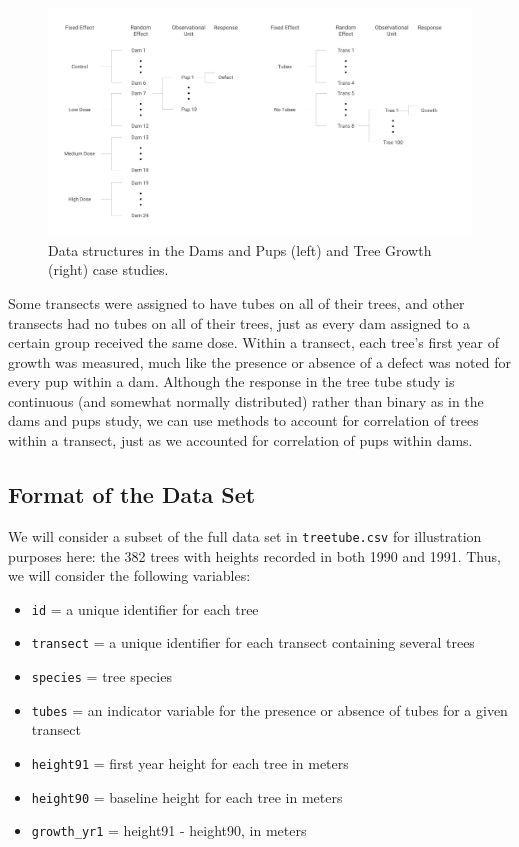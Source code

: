 \documentclass[
]{krantz}
\providecommand{\tightlist}{%
  \setlength{\itemsep}{0pt}\setlength{\parskip}{0pt}}
\begin{document}
\begin{figure}
\includegraphics[width=0.8\linewidth,height=1.25\textheight]{data/DamsTreesStructure} \caption{Data structures in the Dams and Pups (left) and Tree Growth (right) case studies.}\label{fig:DamsTreesStructure}
\end{figure}

Some transects were assigned to have tubes on all of their trees, and other transects had no tubes on all of their trees, just as every dam assigned to a certain group received the same dose. Within a transect, each tree's first year of growth was measured, much like the presence or absence of a defect was noted for every pup within a dam. Although the response in the tree tube study is continuous (and somewhat normally distributed) rather than binary as in the dams and pups study, we can use methods to account for correlation of trees within a transect, just as we accounted for correlation of pups within dams.

\hypertarget{format-of-the-data-set}{%
\subsection{Format of the Data Set}\label{format-of-the-data-set}}

We will consider a subset of the full data set in \texttt{treetube.csv} for illustration purposes here: the 382 trees with heights recorded in both 1990 and 1991. Thus, we will consider the following variables:

\begin{itemize}
\tightlist
\item
  \texttt{id} = a unique identifier for each tree
\item
  \texttt{transect} = a unique identifier for each transect containing several trees
\item
  \texttt{species} = tree species
\item
  \texttt{tubes} = an indicator variable for the presence or absence of tubes for a given transect
\item
  \texttt{height91} = first year height for each tree in meters
\item
  \texttt{height90} = baseline height for each tree in meters
\item
  \texttt{growth\_yr1} = height91 - height90, in meters
\end{itemize}
\end{document}
